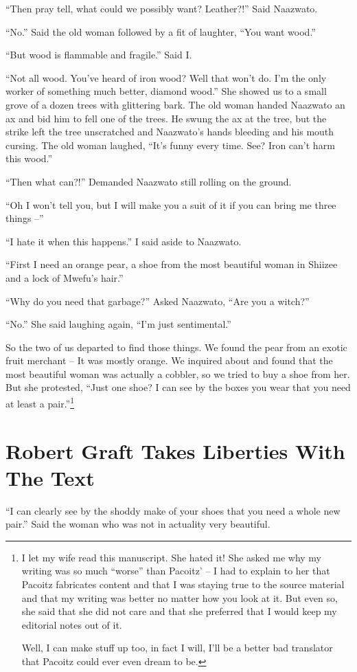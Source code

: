 ``Then pray tell, what could we possibly want? Leather?!'' Said Naa\-zwa\-to.

``No.'' Said the old woman followed by a fit of laughter, ``You want wood.''

``But wood is flammable and fragile.'' Said I.

``Not all wood. You've heard of iron wood? Well that won't do. I'm the only worker of something much better, diamond wood.''
She showed us to a small grove of a dozen trees with glittering bark. The old woman handed Naa\-zwa\-to an ax and bid him to fell one of the trees. He swung the ax at the tree, but the strike left the tree unscratched and Naa\-zwa\-to's hands bleeding and his mouth cursing. The old woman laughed,
``It's funny every time. See? Iron can't harm this wood.'' 

``Then what can?!'' Demanded Naa\-zwa\-to still rolling on the ground.

``Oh I won't tell you, but I will make you a suit of it if you can bring me three things --''

``I hate it when this happens.'' I said aside to Naa\-zwa\-to.

``First I need an orange pear, a shoe from the most beautiful woman in Shiizee and a lock of Mwe\-fu's hair.''

``Why do you need that garbage?'' Asked Naa\-zwa\-to, ``Are you a witch?''

``No.'' She said laughing again, ``I'm just sentimental.''

So the two of us departed to find those things. We found the pear from an exotic fruit merchant -- It was mostly orange. We inquired about and found that the most beautiful woman was actually a cobbler, so we tried to buy a shoe from her. But she protested, ``Just one shoe? I can see by the boxes you wear that you need at least a pair.''\footnote{I let my wife read this manuscript. She hated it!
She asked me why my writing was so much ``worse'' than Pa\-co\-itz' -- I had to explain to her that Pa\-co\-itz fabricates content and that I was staying true to the source material and that my writing was better no matter how you look at it. But even so, she said that she did not care and that she preferred that I would keep my editorial notes out of it.

Well, I can make stuff up too, in fact I will, I'll be a better bad translator that Pa\-co\-itz could ever even dream to be.}

\chapter{Robert Graft Takes Liberties With The Text}
``I can clearly see by the shoddy make of your shoes that you need a whole new pair.'' Said the woman who was not in actuality very beautiful.

